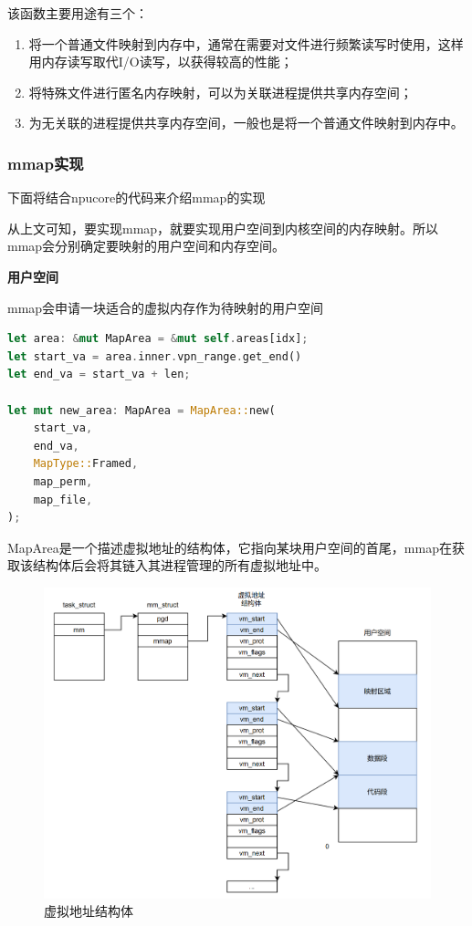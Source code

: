 该函数主要用途有三个：
\begin{enumerate}
    \item 将一个普通文件映射到内存中，通常在需要对文件进行频繁读写时使用，这样用内存读写取代I/O读写，以获得较高的性能；
    \item 将特殊文件进行匿名内存映射，可以为关联进程提供共享内存空间；
    \item 为无关联的进程提供共享内存空间，一般也是将一个普通文件映射到内存中。
\end{enumerate}

\subsubsection{mmap实现}
下面将结合npucore的代码来介绍mmap的实现

从上文可知，要实现mmap，就要实现用户空间到内核空间的内存映射。所以mmap会分别确定要映射的用户空间和内存空间。

\textbf{用户空间}

mmap会申请一块适合的虚拟内存作为待映射的用户空间
\begin{lstlisting}[language={Rust},
	caption={os/src/mm/memory_set.rs}]
let area: &mut MapArea = &mut self.areas[idx];
let start_va = area.inner.vpn_range.get_end()
let end_va = start_va + len;

let mut new_area: MapArea = MapArea::new(
    start_va,
    end_va,
    MapType::Framed,
    map_perm,
    map_file,
);
\end{lstlisting}
MapArea是一个描述虚拟地址的结构体，它指向某块用户空间的首尾，mmap在获取该结构体后会将其链入其进程管理的所有虚拟地址中。

\begin{figure}[H]
    \centering
    \caption[short]{虚拟地址结构体}
    \includegraphics[width=0.8\linewidth]{figures/09-04-mmap-虚拟地址结构体.png}
\end{figure}

